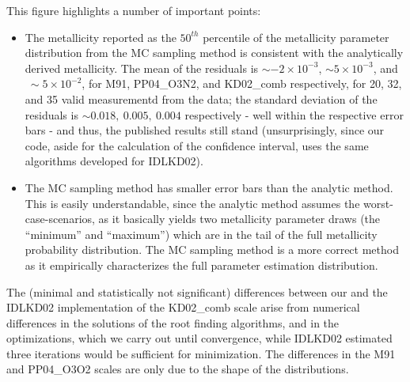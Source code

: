 \documentclass{emulateapj}
\begin{document}
This figure  highlights a number of important points: 
\begin{itemize}

\item
The metallicity reported as the $50^{th}$ percentile of the metallicity parameter distribution from the MC sampling method is consistent with the analytically derived metallicity. The mean of the residuals is $\sim-2\times10^{-3}$, $\sim5\times10^{-3}$, and $~\sim5\times10^{-2}$,  for M91, PP04\_O3N2, and KD02\_comb respectively, for 20, 32, and 35 valid measurementd from the \citet{modjaz11} data; the standard deviation of the residuals is $\sim0.018,~ 0.005,~ 0.004$ respectively -  well within the respective error bars - and thus, the published results still stand (unsurprisingly, since our code, aside for the calculation of the confidence interval, uses the same algorithms developed for IDLKD02). 
\item
The MC sampling method has smaller error bars than the analytic method. This is easily understandable, since the analytic method assumes the worst-case-scenarios, as it basically yields two metallicity parameter draws (the ``minimum'' and ``maximum'') which are in the tail of the full metallicity probability distribution. The MC sampling method is a more correct method as it empirically characterizes the full parameter estimation distribution.

\end{itemize}

The (minimal and statistically not significant) differences between our and the IDLKD02 implementation of the KD02\_comb scale arise from numerical differences in the solutions of the root finding algorithms, and in the optimizations, which we carry out until convergence, while IDLKD02 estimated three iterations would be sufficient for minimization. The differences in the M91 and PP04\_O3O2 scales are only due to the shape of the distributions.  
\end{document}
